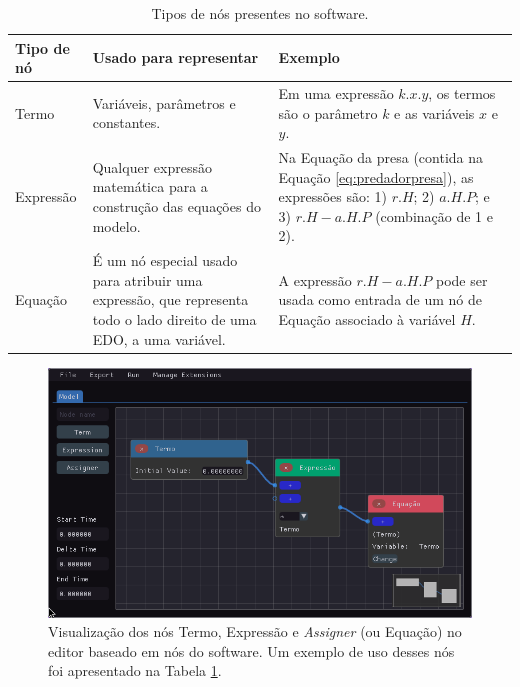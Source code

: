 \documentclass[
	12pt,				%
	openright,			%
	oneside,			%
	a4paper,			%
	main=brazil,
	english,			%
	]{ufsj-abntex2}
\begin{document}
\begin{table}
\begin{center}
\begin{tabular}{ |m{}|m{}|m{}| }
    \hline
    \rowcolor{lightgray} Tipo de nó & Usado para representar & Exemplo \\
    \hline
    Termo & Variáveis, parâmetros e constantes. & Em uma expressão \(k.x.y\), os termos são o parâmetro $k$ e as variáveis $x$ e $y$. \\
    \hline
    Expressão & Qualquer expressão matemática para a construção das equações do modelo. & Na Equação da presa (contida na Equação \ref{eq:predadorpresa}), as expressões são: 1) \(r.H\); 2) \(a.H.P\); e 3) \(r.H - a.H.P\) (combinação de 1 e 2). \\
    \hline
    Equação & É um nó especial usado para atribuir uma expressão, que representa todo o lado direito de uma EDO, a uma variável. & A expressão \(r.H - a.H.P\) pode ser usada como entrada de um nó de Equação associado à variável $H$. \\
    \hline 
\end{tabular}
\end{center}
\caption{Tipos de nós presentes no software.}
\label{tab:tipos-de-nos}
\end{table}

\begin{figure}[h]
    \centering
    \includegraphics[scale=0.55]{imgs/ode-designer/tipos-nos.png} 
    \caption{Visualização dos nós Termo, Expressão e \textit{Assigner} (ou Equação) no editor baseado em nós do software. Um exemplo de uso desses nós foi apresentado na Tabela \ref{tab:tipos-de-nos}. }
    \label{fig:tipos-de-nos}
\end{figure}
\end{document}
